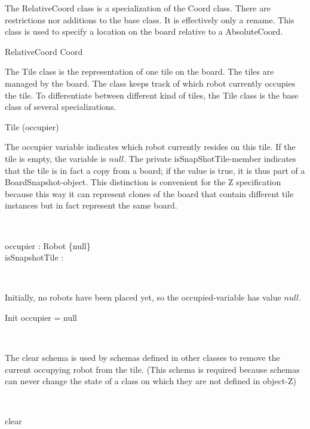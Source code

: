 \documentclass[12pt]{article}
\begin{document}
The RelativeCoord class is a specialization of the Coord class. There are restrictions nor additions to the base class. It is effectively only a rename. This class is used to specify a location on the board relative to a AbsoluteCoord.
\begin{class}{RelativeCoord}
Coord \\
\end{class}

The Tile class is the representation of one tile on the board. The tiles are managed by the board. The class keeps track of which robot currently occupies the tile. To differentiate between different kind of tiles, the Tile class is the base class of several specializations.
 
\begin{class}{Tile}
\upharpoonright (occupier) \\
\begin{zpar}
The occupier variable indicates which robot currently resides on this tile. If the tile is empty, the variable is $null$. The private isSnapShotTile-member indicates that the tile is in fact a copy from a board; if the value is true, it is thus part of a BoardSnapshot-object. This distinction is convenient for the Z specification because this way it can represent clones of the board that contain different tile instances but in fact represent the same board.
\end{zpar} \\
\begin{state}
occupier : Robot \cup \{null\} \\
isSnapshotTile : \bool \\
\end{state} \\
\begin{zpar}
Initially, no robots have been placed yet, so the occupied-variable has value $null$.
\end{zpar}
\begin{schema}{Init}
occupier = null
\end{schema} \\
\begin{zpar}
The clear schema is used by schemas defined in other classes to remove the current occupying robot from the tile. (This schema is required because schemas can never change the state of a class on which they are not defined in object-Z)
\end{zpar} \\
\begin{schema}{clear}

\end{schema}
\end{class}
\end{document}
